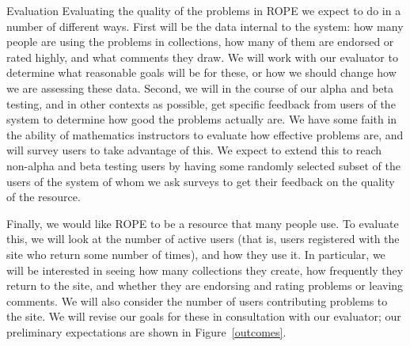 \documentclass[11pt]{article}
\begin{document}
\begin{section}{Evaluation}
Evaluating the quality of the problems in ROPE we expect to do in a number
of different ways.  First will be the data internal to the system: how
many people are using the problems in collections, how many of them are
endorsed or rated highly, and what comments they draw.  We will work with
our evaluator to determine what reasonable goals will be for these, or how
we should change how we are assessing these data.  Second, we will in the
course of our alpha and beta testing, and in other contexts as possible,
get specific feedback from users of the system to determine how good the
problems actually are.  We have some faith in the ability of mathematics
instructors to evaluate how effective problems are, and will survey users
to take advantage of this.  We expect to extend this to reach non-alpha
and beta testing users by having some randomly selected subset of the
users of the system of whom we ask surveys to get their feedback on the
quality of the resource.

Finally, we would like ROPE to be a resource that many people use.  To
evaluate this, we will look at the number of active users (that is, users
registered with the site who return some number of times), and how they
use it.  In particular, we will be interested in seeing how many
collections they create, how frequently they return to the site, and
whether they are endorsing and rating problems or leaving comments.  We
will also consider the number of users contributing problems to the site.
We will revise our goals for these in consultation with our evaluator; our
preliminary expectations are shown in Figure~\ref{outcomes}.



\end{section}
\end{document}
